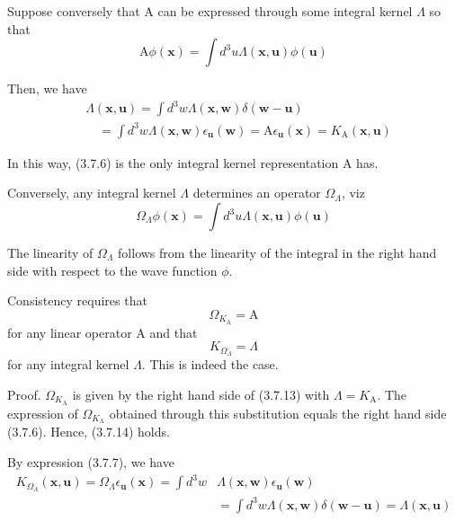 \documentclass{article}
\begin{document}
Suppose conversely that A can be expressed through some integral kernel $\Lambda$ so that
$$
\begin{equation*}
\mathrm{A} \phi(\boldsymbol{x})=\int d^{3} u \Lambda(\boldsymbol{x}, \boldsymbol{u}) \phi(\boldsymbol{u}) \tag{3.7.11}
\end{equation*}
$$

Then, we have
$$
\begin{align*}
& \Lambda(\boldsymbol{x}, \boldsymbol{u})=\int d^{3} w \Lambda(\boldsymbol{x}, \boldsymbol{w}) \delta(\boldsymbol{w}-\boldsymbol{u})  \tag{3.7.12}\\
& \quad=\int d^{3} w \Lambda(\boldsymbol{x}, \boldsymbol{w}) \epsilon_{\boldsymbol{u}}(\boldsymbol{w})=\mathrm{A} \epsilon_{\boldsymbol{u}}(\boldsymbol{x})=K_{\mathrm{A}}(\boldsymbol{x}, \boldsymbol{u})
\end{align*}
$$

In this way, (3.7.6) is the only integral kernel representation A has.

Conversely, any integral kernel $\Lambda$ determines an operator $\Omega_{\Lambda}$, viz
$$
\begin{equation*}
\Omega_{\Lambda} \phi(\boldsymbol{x})=\int d^{3} u \Lambda(\boldsymbol{x}, \boldsymbol{u}) \phi(\boldsymbol{u}) \tag{3.7.13}
\end{equation*}
$$

The linearity of $\Omega_{\Lambda}$ follows from the linearity of the integral in the right hand side with respect to the wave function $\phi$.

Consistency requires that
$$
\begin{equation*}
\Omega_{K_{\mathrm{A}}}=\mathrm{A} \tag{3.7.14}
\end{equation*}
$$
for any linear operator A and that
$$
\begin{equation*}
K_{\Omega_{\Lambda}}=\Lambda \tag{3.7.15}
\end{equation*}
$$
for any integral kernel $\Lambda$. This is indeed the case.

Proof. $\Omega_{K_{\mathrm{A}}}$ is given by the right hand side of (3.7.13) with $\Lambda=K_{\mathrm{A}}$. The expression of $\Omega_{K_{\mathrm{A}}}$ obtained through this substitution equals the right hand side (3.7.6). Hence, (3.7.14) holds.

By expression (3.7.7), we have
$$
\begin{align*}
K_{\Omega_{\Lambda}}(\boldsymbol{x}, \boldsymbol{u})=\Omega_{\Lambda} \epsilon_{\boldsymbol{u}}(\boldsymbol{x})=\int d^{3} w & \Lambda(\boldsymbol{x}, \boldsymbol{w}) \epsilon_{\boldsymbol{u}}(\boldsymbol{w})  \tag{3.7.16}\\
& =\int d^{3} w \Lambda(\boldsymbol{x}, \boldsymbol{w}) \delta(\boldsymbol{w}-\boldsymbol{u})=\Lambda(\boldsymbol{x}, \boldsymbol{u})
\end{align*}
$$
\end{document}
